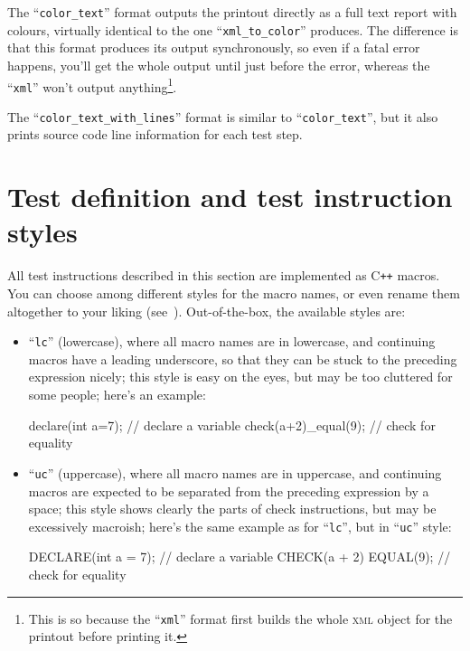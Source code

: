 \documentclass[twoside, a4paper, article]{memoir}
\newcommand*\Cpp{C\texttt{++}}
\begin{document}
The ``\texttt{color\_text}'' format outputs the printout directly as a full
text report with colours, virtually identical to the one
``\texttt{xml\_to\_color}'' produces.  The difference is that this format
produces its output synchronously, so even if a fatal error happens, you'll get
the whole output until just before the error, whereas the ``\texttt{xml}''
won't output anything\footnote{This is so because the ``\texttt{xml}'' format
  first builds the whole \textsc{xml} object for the printout before printing
  it.}.

The ``\texttt{color\_text\_with\_lines}'' format is similar to
``\texttt{color\_text}'', but it also prints source code line information for
each test step.


\chapter{Test definition and test instruction styles}
\label{cha:test-definition-test-instruction-styles}

All test instructions described in this section are implemented as \Cpp{}
macros.  You can choose among different styles for the macro names, or even
rename them altogether to your liking
(see~).
Out-of-the-box, the available styles are:
\begin{itemize}
\item ``\texttt{lc}'' (lowercase), where all macro names are in lowercase, and
  continuing macros have a leading underscore, so that they can be stuck to the
  preceding expression nicely; this style is easy on the eyes, but may be too
  cluttered for some people; here's an example:
\begin{cpplisting}
declare(int a=7); // declare a variable
check(a+2)_equal(9); // check for equality
\end{cpplisting}

\item ``\texttt{uc}'' (uppercase), where all macro names are in uppercase, and
  continuing macros are expected to be separated from the preceding expression
  by a space; this style shows clearly the parts of check instructions, but may
  be excessively macroish; here's the same example as for ``\texttt{lc}'', but
  in ``\texttt{uc}'' style:
\begin{cpplisting}
DECLARE(int a = 7); // declare a variable
CHECK(a + 2) EQUAL(9); // check for equality
\end{cpplisting}
\end{itemize}
\end{document}
